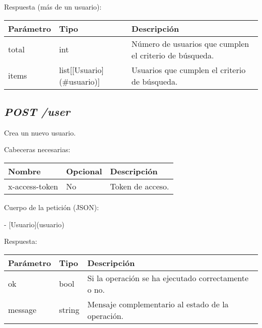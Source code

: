 Respuesta (más de un usuario):
\begin{table}[h!]
	\centering
	\begin{adjustbox}{max width=\textwidth}
	\begin{tabular}{|l|l|l|}
		\hline
		Parámetro & Tipo & Descripción \\ \hline
		total & int & Número de usuarios que cumplen el criterio de búsqueda. \\ \hline
		items & list[[Usuario](\#usuario)] & Usuarios que cumplen el criterio de búsqueda. \\ \hline
	\end{tabular}
\end{adjustbox}
\end{table}


\subsection{\textit{POST /user}}
Crea un nuevo usuario.

Cabeceras necesarias:
\begin{table}[h!]
	\centering
	\begin{adjustbox}{max width=\textwidth}
	\begin{tabular}{|l|l|l|}
		\hline
		Nombre & Opcional & Descripción \\ \hline
		x-access-token & No & Token de acceso. \\ \hline
	\end{tabular}
\end{adjustbox}
\end{table}

Cuerpo de la petición (JSON):

- [Usuario](usuario)

Respuesta:
\begin{table}[!h]
	\centering
	\begin{adjustbox}{max width=\textwidth}
	\begin{tabular}{|l|l|l|}
		\hline
		Parámetro & Tipo & Descripción \\ \hline
		ok & bool & Si la operación se ha ejecutado correctamente o no. \\ \hline
		message & string & Mensaje complementario al estado de la operación. \\ \hline
	\end{tabular}
\end{adjustbox}
\end{table}




